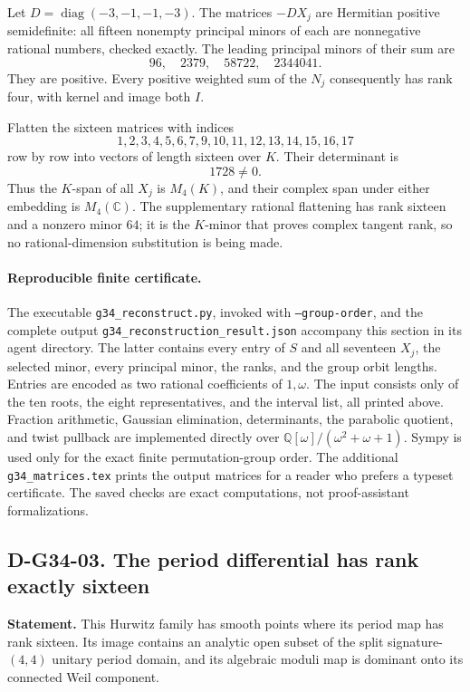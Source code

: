 Let \(D=\operatorname{diag}(-3,-1,-1,-3)\).  The matrices \(-DX_j\) are
Hermitian positive semidefinite: all fifteen nonempty principal minors of
each are nonnegative rational numbers, checked exactly.  The leading principal
minors of their sum are
\[
                         96,\quad2379,\quad58722,\quad2344041.
\]
They are positive.  Every positive weighted sum of the \(N_j\) consequently
has rank four, with kernel and image both \(I\).

Flatten the sixteen matrices with indices
\[
                    1,2,3,4,5,6,7,9,10,11,12,13,14,15,16,17
\]
row by row into vectors of length sixteen over \(K\).  Their determinant is
\[
                                  1728\ne0.
\]
Thus the \(K\)-span of all \(X_j\) is \(M_4(K)\), and their complex span
under either embedding is \(M_4(\mathbb C)\).  The supplementary rational
flattening has rank sixteen and a nonzero minor \(64\); it is the
\(K\)-minor that proves complex tangent rank, so no rational-dimension
substitution is being made.

\paragraph{Reproducible finite certificate.}
The executable \texttt{g34\_reconstruct.py}, invoked with
\texttt{--group-order}, and the complete output
\texttt{g34\_reconstruction\_result.json} accompany this section in its
agent directory.  The latter contains every entry of \(S\) and all seventeen
\(X_j\), the selected minor, every principal minor, the ranks, and the group
orbit lengths.  Entries are encoded as two rational coefficients of
\(1,\omega\).  The input consists only of the ten roots, the eight
representatives, and the interval list, all printed above.  Fraction arithmetic,
Gaussian elimination, determinants, the parabolic quotient, and twist pullback
are implemented directly over \(\mathbb Q[\omega]/(\omega^2+\omega+1)\).
Sympy is used only for the exact finite permutation-group order.  The
additional \texttt{g34\_matrices.tex} prints the output matrices for a reader
who prefers a typeset certificate.  The saved checks are exact computations,
not proof-assistant formalizations.

\subsection*{D-G34-03. The period differential has rank exactly sixteen}

\textbf{Statement.} This Hurwitz family has smooth points where its period
map has rank sixteen.  Its image contains an analytic open subset of the
split signature-\((4,4)\) unitary period domain, and its algebraic moduli map
is dominant onto its connected Weil component.

